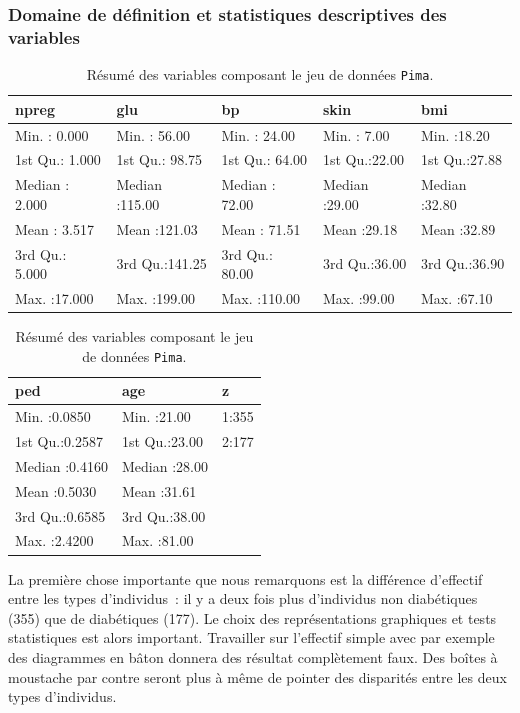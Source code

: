 \documentclass[a4paper,11pt]{report}
\begin{document}
\subsubsection{Domaine de définition et statistiques descriptives des variables}

\begin{table}[H]
	\centering
	\captionsetup{justification=centering, margin=2cm}
	\caption{Résumé des variables composant le jeu de données \texttt{Pima}.}
	\begin{tabular}{|l|l|l|l|l}
		\hline
		npreg &      glu &       bp &      skin &      bmi \\
		\hline
		Min.   : 0.000   & Min.   : 56.00   & Min.   : 24.00   & Min.   : 7.00   & Min.   :18.20  \\
		1st Qu.: 1.000   & 1st Qu.: 98.75   & 1st Qu.: 64.00   & 1st Qu.:22.00   & 1st   Qu.:27.88  \\
		Median : 2.000   & Median :115.00   & Median : 72.00   & Median :29.00   & Median :32.80  \\
		Mean   : 3.517   & Mean   :121.03   & Mean   : 71.51   & Mean   :29.18   & Mean  :32.89  \\ 
		3rd Qu.: 5.000   & 3rd Qu.:141.25   & 3rd Qu.: 80.00   & 3rd Qu.:36.00   & 3rd Qu.:36.90  \\
		Max.   :17.000   & Max.   :199.00   & Max.   :110.00   & Max.   :99.00   & Max.   :67.10  \\
	\end{tabular}
	\begin{tabular}{l|l|l|}
		\hline
		ped &      age & z \\ 
		\hline
		Min.   :0.0850   & Min.   :21.00   & 1:355   \\ 
		1st Qu.:0.2587   & 1st Qu.:23.00   & 2:177   \\ 
		Median :0.4160   & Median :28.00   &  \\ 
		Mean   :0.5030   & Mean   :31.61   &  \\ 
		3rd Qu.:0.6585   & 3rd Qu.:38.00   &  \\ 
		Max.   :2.4200   & Max.   :81.00   &  \\ 
	\end{tabular}
\end{table}


La première chose importante que nous remarquons est la différence d'effectif entre les types d'individus~: il y a deux fois plus d'individus non diabétiques (355) que de diabétiques (177). Le choix des représentations graphiques et tests statistiques est alors important. Travailler sur l'effectif simple avec par exemple des diagrammes en bâton donnera des résultat complètement faux. Des boîtes à moustache par contre seront plus à même de pointer des disparités entre les deux types d'individus.
\end{document}
